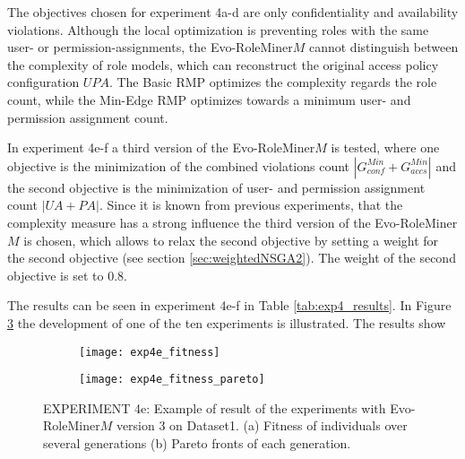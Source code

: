 The objectives chosen for experiment 4a-d are only confidentiality and availability violations. Although the local optimization is preventing roles with the same user- or permission-assignments, the Evo-RoleMiner$M$ cannot distinguish between the complexity of role models, which can reconstruct the original access policy configuration $UPA$. The Basic RMP optimizes the complexity regards the role count, while the Min-Edge RMP optimizes towards a minimum user- and permission assignment count.

In experiment 4e-f a third version of the Evo-RoleMiner$M$ is tested, where one objective is the minimization of the combined violations count $|G_{conf}^{Min} + G_{accs}^{Min}|$ and the second objective is the minimization of user- and permission assignment count $|UA + PA|$. Since it is known from previous experiments, that the complexity measure has a strong influence the third version of the Evo-RoleMiner$M$ is chosen, which allows to relax the second objective by setting a weight for the second objective (see section \ref{sec:weightedNSGA2}). The weight of the second objective is set to 0.8.

The results can be seen in experiment 4e-f in Table \ref{tab:exp4_results}. In Figure \ref{fig:exp4e_fitness} the development of one of the ten experiments is illustrated. The results show 

\begin{figure}[H]
	\centering
	\begin{subfigure}{\textwidth}
		\centering
		\texttt{[image: exp4e\_fitness]}
		\caption{}
		\label{fig:exp4e_fitness_A}
	\end{subfigure}
	\begin{subfigure}{\textwidth}
		\centering
		\texttt{[image: exp4e\_fitness\_pareto]}
		\caption{}
		\label{fig:exp4e_fitness_B}
	\end{subfigure}
	\caption{EXPERIMENT 4e: Example of result of the experiments with Evo-RoleMiner$M$ version 3 on Dataset1. (a) Fitness of individuals over several generations (b) Pareto fronts of each generation.}
	\label{fig:exp4e_fitness}
\end{figure}



